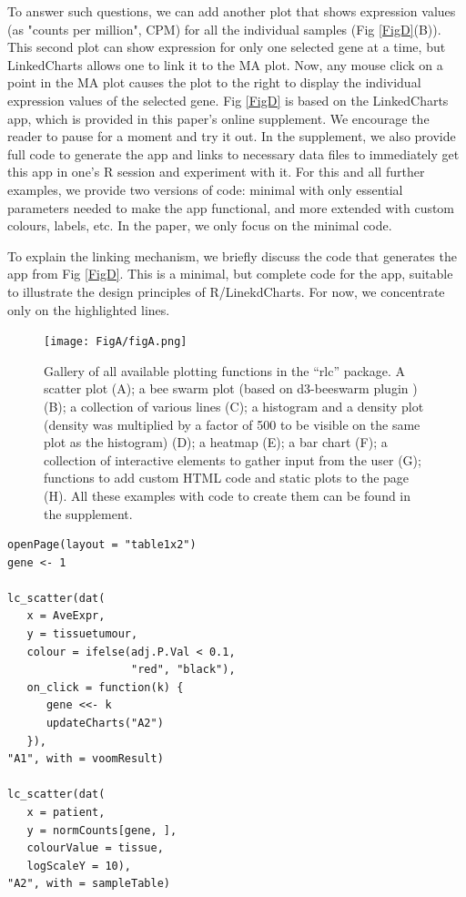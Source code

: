 \documentclass[twocolumn,10pt]{article}
\begin{document}
To answer such questions, we can add another plot that shows expression values (as "counts per million", CPM) for all the individual samples (Fig \ref{FigD}(B)). This second plot can show expression for only one selected gene at a time, but LinkedCharts allows one to link it to the MA plot. Now, any mouse click on a point in the MA plot causes the plot to the right to display the individual expression values of the selected gene. Fig \ref{FigD} is based on the LinkedCharts app, which is provided in this paper's online supplement. We encourage the reader to pause for a moment and try it out. In the supplement, we also provide full code to generate the app and links to necessary data files to immediately get this app in one's R session and experiment with it. For this and all further examples, we provide two versions of code: minimal with only essential parameters needed to make the app functional, and more extended with custom colours, labels, etc. In the paper, we only focus on the minimal code.

To  explain the linking mechanism, we briefly discuss the code that generates the app from Fig \ref{FigD}. This is a minimal, but complete code for the app, suitable to illustrate the design principles of R/LinekdCharts. For now, we concentrate only on the highlighted lines.

\begin{figure}[b]
	\texttt{[image: FigA/figA.png]}
	\caption{Gallery of all available plotting functions in the ``rlc'' package. A scatter plot (A); a bee swarm plot (based on d3-beeswarm plugin \citep{lebeau_2017}) (B); a collection of various lines (C); a histogram and a density plot (density was multiplied by a factor of 500 to be visible on the same plot as the histogram) (D); a heatmap (E); a bar chart (F); a collection of interactive elements to gather input from the user (G); functions to add custom HTML code and static plots to the page (H). All these examples with code to create them can be found in the supplement.}
	\label{FigA}
\end{figure}

\begin{verbatim}
openPage(layout = "table1x2")
gene <- 1

lc_scatter(dat(
   x = AveExpr,
   y = tissuetumour,
   colour = ifelse(adj.P.Val < 0.1, 
                   "red", "black"),
   on_click = function(k) {
      gene <<- k
      updateCharts("A2")
   }),
"A1", with = voomResult)

lc_scatter(dat(
   x = patient,
   y = normCounts[gene, ],
   colourValue = tissue, 
   logScaleY = 10),
"A2", with = sampleTable)
\end{verbatim}
\end{document}
